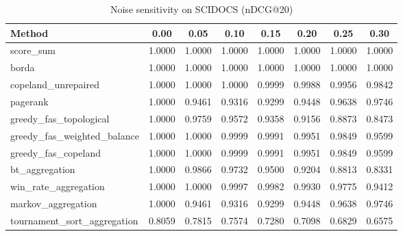 \begin{table}[ht]
\centering
\caption{Noise sensitivity on SCIDOCS (nDCG@20)}
\label{tab:noise_sensitivity_scidocs}
\begin{tabular}{lccccccc}
\toprule
Method & 0.00 & 0.05 & 0.10 & 0.15 & 0.20 & 0.25 & 0.30 \\
\midrule
score\_sum & 1.0000 & 1.0000 & 1.0000 & 1.0000 & 1.0000 & 1.0000 & 1.0000 \\
borda & 1.0000 & 1.0000 & 1.0000 & 1.0000 & 1.0000 & 1.0000 & 1.0000 \\
copeland\_unrepaired & 1.0000 & 1.0000 & 1.0000 & 0.9999 & 0.9988 & 0.9956 & 0.9842 \\
pagerank & 1.0000 & 0.9461 & 0.9316 & 0.9299 & 0.9448 & 0.9638 & 0.9746 \\
greedy\_fas\_topological & 1.0000 & 0.9759 & 0.9572 & 0.9358 & 0.9156 & 0.8873 & 0.8473 \\
greedy\_fas\_weighted\_balance & 1.0000 & 1.0000 & 0.9999 & 0.9991 & 0.9951 & 0.9849 & 0.9599 \\
greedy\_fas\_copeland & 1.0000 & 1.0000 & 0.9999 & 0.9991 & 0.9951 & 0.9849 & 0.9599 \\
bt\_aggregation & 1.0000 & 0.9866 & 0.9732 & 0.9500 & 0.9204 & 0.8813 & 0.8331 \\
win\_rate\_aggregation & 1.0000 & 1.0000 & 0.9997 & 0.9982 & 0.9930 & 0.9775 & 0.9412 \\
markov\_aggregation & 1.0000 & 0.9461 & 0.9316 & 0.9299 & 0.9448 & 0.9638 & 0.9746 \\
tournament\_sort\_aggregation & 0.8059 & 0.7815 & 0.7574 & 0.7280 & 0.7098 & 0.6829 & 0.6575 \\
\bottomrule
\end{tabular}
\end{table}